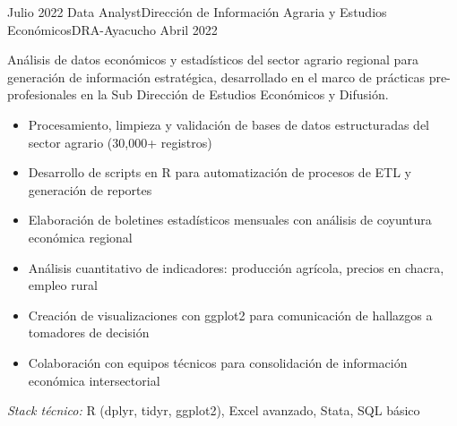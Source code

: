 \begin{experiences}
\experience
{Julio 2022} {Data Analyst}{Dirección de Información Agraria y Estudios Económicos}{DRA-Ayacucho}
{Abril 2022} {
	Análisis de datos económicos y estadísticos del sector agrario regional para generación de información estratégica, desarrollado en el marco de prácticas pre-profesionales en la Sub Dirección de Estudios Económicos y Difusión.
	\begin{itemize}
		\item Procesamiento, limpieza y validación de bases de datos estructuradas del sector agrario (30,000+ registros)
		\item Desarrollo de scripts en R para automatización de procesos de ETL y generación de reportes
		\item Elaboración de boletines estadísticos mensuales con análisis de coyuntura económica regional
		\item Análisis cuantitativo de indicadores: producción agrícola, precios en chacra, empleo rural
		\item Creación de visualizaciones con ggplot2 para comunicación de hallazgos a tomadores de decisión
		\item Colaboración con equipos técnicos para consolidación de información económica intersectorial
	\end{itemize}
}
{\footnotesize{\emph{Stack técnico:} R (dplyr, tidyr, ggplot2), Excel avanzado, Stata, SQL básico}}

\end{experiences}
